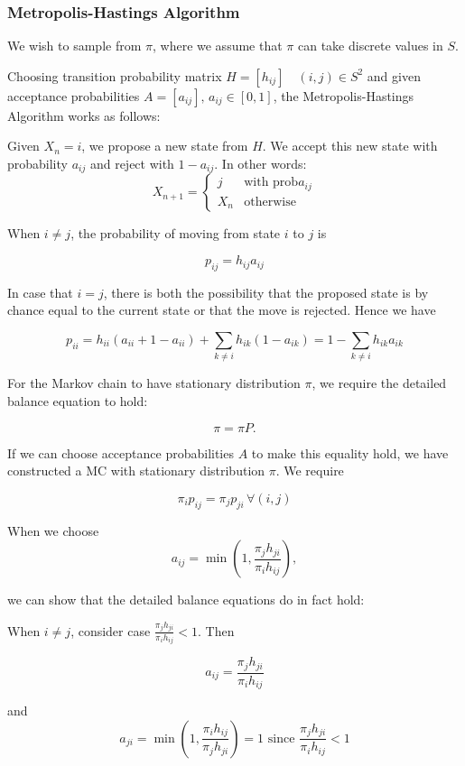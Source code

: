 \documentclass{article}
\theoremstyle{definition}
\begin{document}
\subsubsection{Metropolis-Hastings Algorithm}
We wish to sample from $\pi$, where we assume that $\pi$ can take discrete values in $S$.

Choosing transition probability matrix $H = [h_{ij}] \quad (i,j) \in S^2$ and
given acceptance probabilities $A = [a_{ij}], \, a_{ij} \in [0,1]$, the Metropolis-Hastings
Algorithm works as follows:

Given $X_n = i$, we propose a new state from $H$. We accept this new state with probability
$a_{ij}$ and reject with $1-a_{ij}$. In other words:
$$
X_{n+1} =
\begin{cases}
j & \text{with prob} a_{ij} \\
X_n & \text{otherwise}
\end{cases}
$$

When $i \ne j$, the probability of moving from state $i$ to $j$ is

$$
p_{ij} = h_{ij} a_{ij}
$$

In case that $i = j$, there is both the possibility that the proposed state is
by chance equal to the current state or that the move is rejected. Hence we have

$$
p_{ii} = h_{ii} (a_{ii} + 1 - a_{ii}) + \sum_{k \ne i } h_{ik} ( 1 - a_{ik} ) = 1 - \sum_{k \ne i} h_{ik} a_{ik}
$$

For the Markov chain to have stationary distribution $\pi$, we require the
detailed balance equation to hold:

$$
\pi = \pi P.
$$

If we can choose acceptance probabilities $A$ to make this equality hold, we have constructed a MC with stationary
distribution $\pi$. We require

$$
\pi_i p_{ij} = \pi_j p_{ji} \, \forall (i,j)
$$

When we choose
$$
a_{ij} = \min \left( 1, \frac{\pi_j h_{ji}}{\pi_i h_{ij}} \right),
$$

we can show that the detailed balance equations do in fact hold:

When $i \ne j$, consider case $\frac{\pi_j h_{ji}}{\pi_i h_{ij}} < 1$. Then

$$
a_{ij} = \frac{\pi_j h_{ji}}{\pi_i h_{ij}}
$$

and
$$
a_{ji} = \min \left( 1, \frac{\pi_i h_{ij}}{\pi_j h_{ji}} \right) = 1 \text{ since } \frac{\pi_j h_{ji}}{\pi_i h_{ij}} < 1
$$
\end{document}
